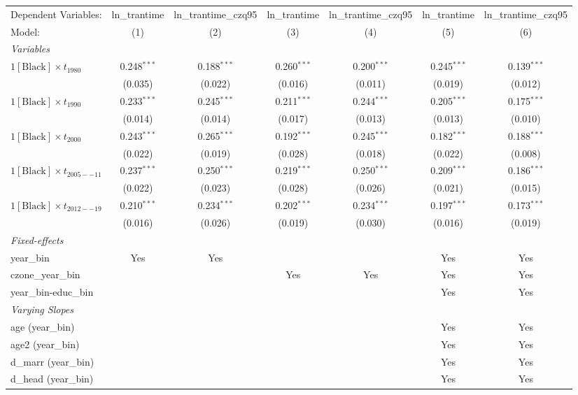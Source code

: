 \begin{tabular}{lcccccc}
\tabularnewline\midrule\midrule
Dependent Variables:&ln\_trantime&ln\_trantime\_czq95&ln\_trantime&ln\_trantime\_czq95&ln\_trantime&ln\_trantime\_czq95\\
Model:&(1) & (2) & (3) & (4) & (5) & (6)\\
\midrule \emph{Variables}&   &   &   &   &   &  \\
$1[\text{Black}] \times t_{1980}$ & 0.248$^{***}$ & 0.188$^{***}$ & 0.260$^{***}$ & 0.200$^{***}$ & 0.245$^{***}$ & 0.139$^{***}$\\
  &(0.035) & (0.022) & (0.016) & (0.011) & (0.019) & (0.012)\\
$1[\text{Black}] \times t_{1990}$ & 0.233$^{***}$ & 0.245$^{***}$ & 0.211$^{***}$ & 0.244$^{***}$ & 0.205$^{***}$ & 0.175$^{***}$\\
  &(0.014) & (0.014) & (0.017) & (0.013) & (0.013) & (0.010)\\
$1[\text{Black}] \times t_{2000}$ & 0.243$^{***}$ & 0.265$^{***}$ & 0.192$^{***}$ & 0.245$^{***}$ & 0.182$^{***}$ & 0.188$^{***}$\\
  &(0.022) & (0.019) & (0.028) & (0.018) & (0.022) & (0.008)\\
$1[\text{Black}] \times t_{2005--11}$ & 0.237$^{***}$ & 0.250$^{***}$ & 0.219$^{***}$ & 0.250$^{***}$ & 0.209$^{***}$ & 0.186$^{***}$\\
  &(0.022) & (0.023) & (0.028) & (0.026) & (0.021) & (0.015)\\
$1[\text{Black}] \times t_{2012--19}$ & 0.210$^{***}$ & 0.234$^{***}$ & 0.202$^{***}$ & 0.234$^{***}$ & 0.197$^{***}$ & 0.173$^{***}$\\
  &(0.016) & (0.026) & (0.019) & (0.030) & (0.016) & (0.019)\\
\midrule \emph{Fixed-effects}&   &   &   &   &   &  \\
year\_bin & Yes & Yes &  &  & Yes & Yes\\
czone\_year\_bin &  &  & Yes & Yes & Yes & Yes\\
year\_bin-educ\_bin &  &  &  &  & Yes & Yes\\
\midrule \emph{Varying Slopes}&   &   &   &   &   &  \\
age (year\_bin) &  &  &  &  & Yes & Yes\\
age2 (year\_bin) &  &  &  &  & Yes & Yes\\
d\_marr (year\_bin) &  &  &  &  & Yes & Yes\\
d\_head (year\_bin) &  &  &  &  & Yes & Yes\\

\end{tabular}
